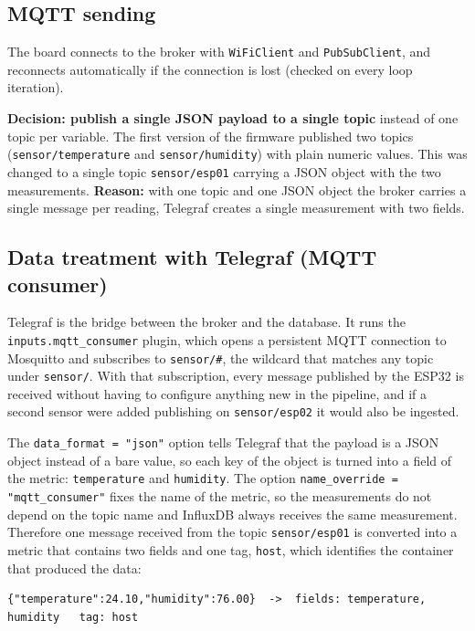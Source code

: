 \documentclass[11pt,a4paper]{article}
\begin{document}
\subsection{MQTT sending}

The board connects to the broker with \texttt{WiFiClient} and \texttt{PubSubClient}, and
reconnects automatically if the connection is lost (checked on every loop iteration).

\textbf{Decision: publish a single JSON payload to a single topic} instead of one topic per
variable. The first version of the firmware published two topics
(\texttt{sensor/temperature} and \texttt{sensor/humidity}) with plain numeric values. This
was changed to a single topic \texttt{sensor/esp01} carrying a JSON object with the two
measurements. \textbf{Reason:} with one topic and one JSON object the broker carries a single
message per reading, Telegraf creates a single measurement with two fields.

\subsection{Data treatment with Telegraf (MQTT consumer)}

Telegraf is the bridge between the broker and the database. It runs the
\texttt{inputs.mqtt\_consumer} plugin, which opens a persistent MQTT connection to Mosquitto
and subscribes to \texttt{sensor/\#}, the wildcard that matches any topic under \texttt{sensor/}.
With that subscription, every message published by the ESP32 is received without having to
configure anything new in the pipeline, and if a second sensor were added publishing on
\texttt{sensor/esp02} it would also be ingested.

The \texttt{data\_format = "json"} option tells Telegraf that the payload is a JSON object
instead of a bare value, so each key of the object is turned into a field of the metric:
\texttt{temperature} and \texttt{humidity}. The option \texttt{name\_override =
"mqtt\_consumer"} fixes the name of the metric, so the measurements do not depend on the topic
name and InfluxDB always receives the same measurement. Therefore one message received from
the topic \texttt{sensor/esp01} is converted into a metric that contains two fields and one
tag, \texttt{host}, which identifies the container that produced the data:

\begin{lstlisting}
{"temperature":24.10,"humidity":76.00}  ->  fields: temperature, humidity   tag: host
\end{lstlisting}
\end{document}

